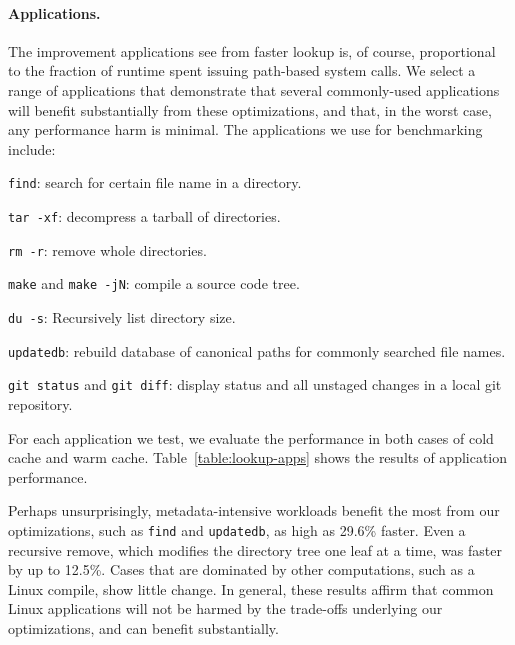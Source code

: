 \paragraph{Applications.}
The improvement applications see from faster lookup is, of course, proportional 
to the fraction of runtime spent issuing path-based system calls.
We select a range of applications that demonstrate that 
several commonly-used applications will benefit substantially from these optimizations,
and that, in the worst case, any performance harm is minimal.
The applications we use for benchmarking include:
\begin{compactitem}
\item {\tt find}: search for certain file name in a directory.
\item {\tt tar -xf}: decompress a tarball of directories.
\item {\tt rm -r}: remove whole directories.
\item {\tt make} and {\tt make -jN}: compile a source code tree.
\item {\tt du -s}: Recursively list directory size.
\item {\tt updatedb}: rebuild database of canonical paths for commonly searched file names.
\item {\tt git status} and {\tt git diff}: display status and all unstaged changes in a local git repository.
\end{compactitem}
For each application we test, we evaluate the performance in both cases of cold cache and warm cache.
Table~\ref{table:lookup-apps} shows the results of application performance.
 
Perhaps unsurprisingly, metadata-intensive workloads benefit the most from our optimizations,
such as {\tt find} and {\tt updatedb}, as high 
as 29.6\% faster.  Even 
a recursive remove, which modifies the directory tree one leaf at a time, was faster by up to 12.5\%.
Cases that are dominated by other computations, such as a Linux compile, show little change.
In general, these results affirm that common Linux applications will not be harmed by 
the trade-offs underlying our optimizations, and can benefit substantially.


